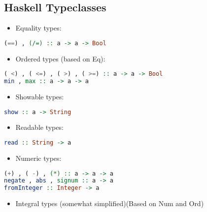 \hypertarget{haskell-typeclasses}{%
\subsection{Haskell Typeclasses}\label{haskell-typeclasses}}

\begin{itemize}
\tightlist
\item
  Equality types:
\end{itemize}

\begin{lstlisting}[language=Haskell]
(==) , (/=) :: a -> a -> Bool
\end{lstlisting}

\begin{itemize}
\tightlist
\item
  Ordered types (based on Eq):
\end{itemize}

\begin{lstlisting}[language=Haskell]
( <) , ( <=) , ( >) , ( >=) :: a -> a -> Bool
min , max :: a -> a -> a
\end{lstlisting}

\begin{itemize}
\tightlist
\item
  Showable types:
\end{itemize}

\begin{lstlisting}[language=Haskell]
show :: a -> String
\end{lstlisting}

\begin{itemize}
\tightlist
\item
  Readable types:
\end{itemize}

\begin{lstlisting}[language=Haskell]
read :: String -> a
\end{lstlisting}

\begin{itemize}
\tightlist
\item
  Numeric types:
\end{itemize}

\begin{lstlisting}[language=Haskell]
(+) , ( -) , (*) :: a -> a -> a
negate , abs , signum :: a -> a
fromInteger :: Integer -> a
\end{lstlisting}

\begin{itemize}
\tightlist
\item
  Integral types (somewhat simplified)(Based on Num and Ord)
\end{itemize}

